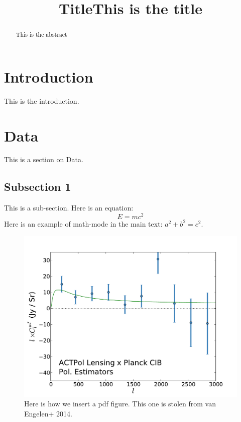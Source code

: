 \documentclass[apj]{emulateapj}
\title{Title}
\begin{document}
\title{This is the title}
\begin{abstract}
This is the abstract
\end{abstract}





\section{Introduction}
\label{sec:intro}

This is the introduction.


\section{Data}
\label{sec:data}
This is a section on Data.


\subsection{Subsection 1}
\label{sec:cmb_data}
This is a sub-section.
Here is an equation:
\begin{equation}
E = mc^2
\label{eq:relativity}
\end{equation}
Here is an example of math-mode in the main text: $a^2 + b^2 = c^2$.


\begin{figure}
\includegraphics[width=1.05\columnwidth]{plotAllPatches_Polonly.pdf}
\caption{Here is how we insert a pdf figure.  This one is stolen from van Engelen+ 2014.\vspace{3mm}}
\label{fig:figureOfSpectrum}
\end{figure}
\end{document}
